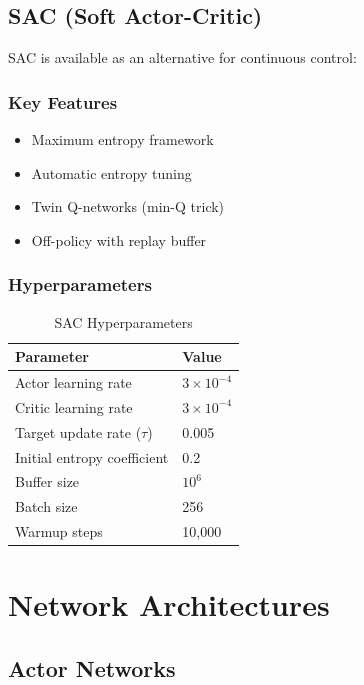 \documentclass[11pt]{article}
\begin{document}
\subsection{SAC (Soft Actor-Critic)}

SAC is available as an alternative for continuous control:

\subsubsection{Key Features}
\begin{itemize}
    \item Maximum entropy framework
    \item Automatic entropy tuning
    \item Twin Q-networks (min-Q trick)
    \item Off-policy with replay buffer
\end{itemize}

\subsubsection{Hyperparameters}

\begin{table}[H]
\centering
\caption{SAC Hyperparameters}
\begin{tabular}{@{}ll@{}}
\toprule
\textbf{Parameter} & \textbf{Value} \\
\midrule
Actor learning rate & $3 \times 10^{-4}$ \\
Critic learning rate & $3 \times 10^{-4}$ \\
Target update rate ($\tau$) & 0.005 \\
Initial entropy coefficient & 0.2 \\
Buffer size & $10^6$ \\
Batch size & 256 \\
Warmup steps & 10,000 \\
\bottomrule
\end{tabular}
\end{table}

\section{Network Architectures}

\subsection{Actor Networks}
\end{document}
